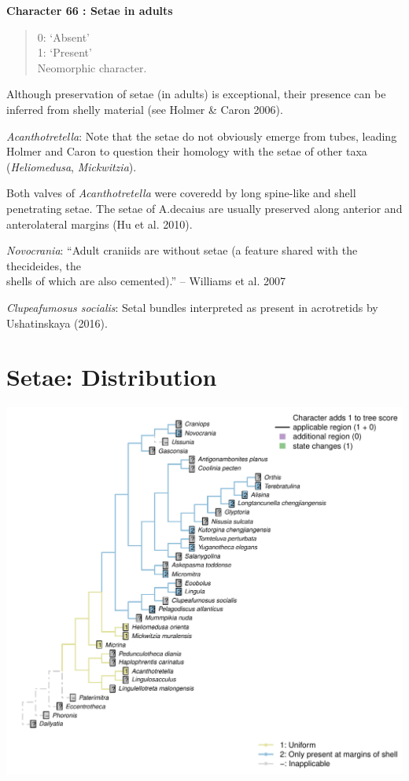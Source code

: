 \documentclass[]{book}
\theoremstyle{definition}
\theoremstyle{definition}
\theoremstyle{definition}
\theoremstyle{remark}
\begin{document}
\textbf{Character 66 : Setae in adults }

\begin{quote}
0: `Absent'\\
1: `Present'\\
Neomorphic character.
\end{quote}

Although preservation of setae (in adults) is exceptional, their
presence can be inferred from shelly material (see Holmer \& Caron
2006).

\emph{Acanthotretella}: Note that the setae do not obviously emerge from
tubes, leading Holmer and Caron to question their homology with the
setae of other taxa (\emph{Heliomedusa}, \emph{Mickwitzia}).

Both valves of \emph{Acanthotretella} were coveredd by long spine-like
and shell penetrating setae. The setae of A.decaius are usually
preserved along anterior and anterolateral margins (Hu et al. 2010).

\emph{Novocrania}: ``Adult craniids are without setae (a feature shared
with the thecideides, the\\
shells of which are also cemented).'' -- Williams et al. 2007

\emph{Clupeafumosus socialis}: Setal bundles interpreted as present in
acrotretids by Ushatinskaya (2016).

\hypertarget{setae-distribution}{%
\section*{Setae: Distribution}\label{setae-distribution}}

\includegraphics{Brachiopod_phylogeny_files/figure-latex/unnamed-chunk-5-67.pdf}
\end{document}
